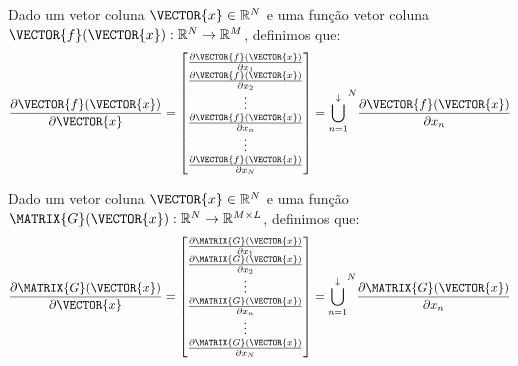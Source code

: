\begin{definition}\label{def:deltaver2}
Dado 
um vetor coluna $\VECTOR{x}\in \mathbb{R}^N$ e 
uma função vetor coluna $\VECTOR{f}(\VECTOR{x}): \mathbb{R}^N \rightarrow \mathbb{R}^M$, 
definimos que:
\begin{equation}
\frac{\partial \VECTOR{f}(\VECTOR{x}) }{\partial \VECTOR{x}}= 
\left[
\begin{matrix}
\frac{\partial \VECTOR{f}(\VECTOR{x}) }{\partial x_{1}} \\
\frac{\partial \VECTOR{f}(\VECTOR{x}) }{\partial x_{2}} \\
\vdots \\
\frac{\partial \VECTOR{f}(\VECTOR{x}) }{\partial x_{n}} \\
\vdots \\
\frac{\partial \VECTOR{f}(\VECTOR{x}) }{\partial x_{N}}
\end{matrix}
\right] =  
{\bigcup\limits_{n=1}^{\downarrow}}^{N}{\frac{\partial \VECTOR{f}(\VECTOR{x}) }{\partial x_{n}}}
\end{equation}
\end{definition}

\begin{definition}\label{def:deltaver3}
Dado 
um vetor coluna $\VECTOR{x}\in \mathbb{R}^N$ e 
uma função $\MATRIX{G}(\VECTOR{x}): \mathbb{R}^N \rightarrow \mathbb{R}^{M\times L}$, 
definimos que:
\begin{equation}
\frac{\partial \MATRIX{G}(\VECTOR{x}) }{\partial \VECTOR{x}}= 
\left[
\begin{matrix}
\frac{\partial \MATRIX{G}(\VECTOR{x}) }{\partial x_{1}} \\
\frac{\partial \MATRIX{G}(\VECTOR{x}) }{\partial x_{2}} \\
\vdots \\
\frac{\partial \MATRIX{G}(\VECTOR{x}) }{\partial x_{n}} \\
\vdots \\
\frac{\partial \MATRIX{G}(\VECTOR{x}) }{\partial x_{N}}
\end{matrix}
\right] = {\bigcup\limits_{n=1}^{\downarrow}}^{N}{\frac{\partial \MATRIX{G}(\VECTOR{x}) }{\partial x_{n}}}
\end{equation}
\end{definition}

